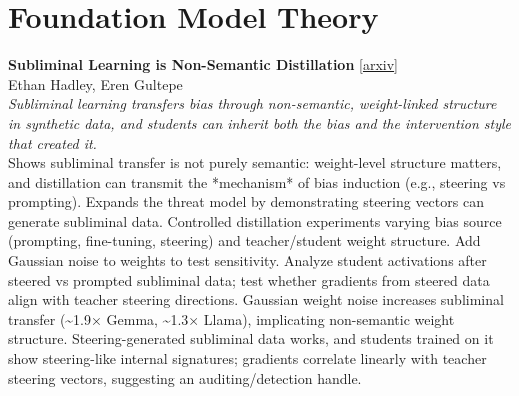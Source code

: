 \documentclass[12pt,letterpaper]{article}
\begin{document}
\medskip


\section*{Foundation Model Theory}

{\small\textbf{Subliminal Learning is Non-Semantic Distillation}} {\scriptsize[\href{https://arxiv.org/abs/2608.05734}{arxiv}]}\\
{\scriptsize Ethan Hadley, Eren Gultepe}\\

{\small\textit{Subliminal learning transfers bias through non-semantic, weight-linked structure in synthetic data, and students can inherit both the bias and the intervention style that created it.}}\\[1pt]
{\footnotesize Shows subliminal transfer is not purely semantic: weight-level structure matters, and distillation can transmit the *mechanism* of bias induction (e.g., steering vs prompting). Expands the threat model by demonstrating steering vectors can generate subliminal data. Controlled distillation experiments varying bias source (prompting, fine-tuning, steering) and teacher/student weight structure. Add Gaussian noise to weights to test sensitivity. Analyze student activations after steered vs prompted subliminal data; test whether gradients from steered data align with teacher steering directions. Gaussian weight noise increases subliminal transfer (\textasciitilde{}1.9× Gemma, \textasciitilde{}1.3× Llama), implicating non-semantic weight structure. Steering-generated subliminal data works, and students trained on it show steering-like internal signatures; gradients correlate linearly with teacher steering vectors, suggesting an auditing/detection handle.}

\medskip
\end{document}
